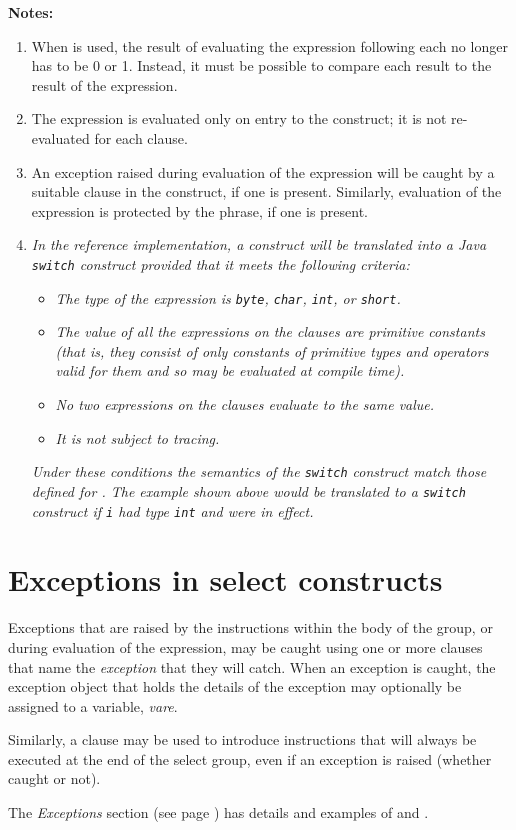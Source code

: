 \textbf{Notes:}
\begin{enumerate}
\item When  is used, the result of evaluating the expression
following each  no longer has to be 0 or 1.  Instead, it
must be possible to compare each result to the result of the
 expression.
\item 
The  expression is evaluated only on entry to the
 construct; it is not re-evaluated for each 
clause.
\item 
An exception raised during evaluation of the  expression
will be caught by a suitable  clause in the construct, if
one is present.
Similarly, evaluation of the  expression is protected by
the  phrase, if one is present.
\item 
\emph{In the reference implementation, a  construct will
be translated into a Java \texttt{switch} construct provided that it
meets the following criteria:}
\begin{itemize}
\item 
\emph{The type of the  expression
is \texttt{byte}, \texttt{char}, \texttt{int}, or \texttt{short}.}
\item 
\emph{The value of all the expressions on the  clauses are
primitive constants (that is, they consist of only constants of
primitive types and operators valid for them and so may be evaluated at
compile time).}
\item 
\emph{No two expressions on the  clauses evaluate to the same
value.}
\item 
\emph{It is not subject to tracing.}
\end{itemize}
\emph{Under these conditions the semantics of the \texttt{switch} construct
match those defined for .  The example shown above would
be translated to a \texttt{switch} construct if \texttt{i} had type \texttt{int}
and  were in effect.}
\end{enumerate}
\section{Exceptions in select constructs}
 
Exceptions that are raised by the instructions within the body of the
group, or during evaluation of the  expression, may be
caught using one or more  clauses that name
the \emph{exception} that they will catch.
When an exception is caught, the exception object that holds the details
of the exception may optionally be assigned to a variable,
\emph{vare}.
 
Similarly, a  clause may be used to introduce
instructions that will always be executed at the end of the select
group, even if an exception is raised (whether caught or not).
 
The  \emph{Exceptions} section (see page \pageref{refexcep})  has details and
examples of  and .
\index{,}
